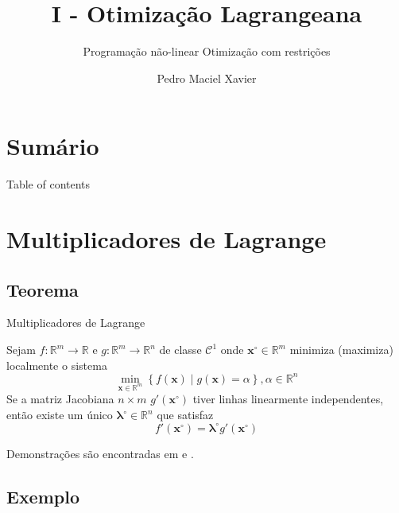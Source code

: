 \documentclass[brazil, MathSerif, aspectratio = 169]{beamer}
\author[Pedro]
{Pedro Maciel Xavier}
\title{I - Otimização Lagrangeana}
\subtitle{\small Programação não-linear \textbullet{} Otimização com restrições}
\begin{document}
\section{Sumário}
%
%
\begin{frame}[allowframebreaks]{Table of contents}
    \tableofcontents
\end{frame}

\section{Multiplicadores de Lagrange}

\subsection{Teorema}

\hidelogo

\begin{frame}{Multiplicadores de Lagrange}

    \begin{theorem}
        Sejam $f: \mathbb{R}^{m} \to \mathbb{R}$ e $g: \mathbb{R}^{m} \to \mathbb{R}^n$ de classe $\mathcal{C}^{1}$ onde $\mathbf{x}^{\circ} \in \mathbb{R}^{m}$ minimiza (maximiza) localmente o sistema
        $$ \min_{\mathbf{x} \in \mathbb{R}^{m}}\left\{ f(\mathbf{x}) \middle| g(\mathbf{x})  = \alpha \right\}, \alpha \in \mathbb{R}^{n} $$
        Se a matriz Jacobiana $n \times m$ $g'(\mathbf{x}^{\circ})$ tiver linhas linearmente independentes, então existe um único $\pmb{\lambda}^{\circ} \in \mathbb{R}^{n}$ que satisfaz
        $$ f'(\mathbf{x}^{\circ}) = \pmb{\lambda}^{\circ} g'(\mathbf{x}^{\circ}) $$
    \end{theorem}

    
    Demonstrações são encontradas em \cite{brezhneva:2011} e \cite{luenberger:2008}.
    
        
\end{frame}


\subsection{Exemplo}
\end{document}

